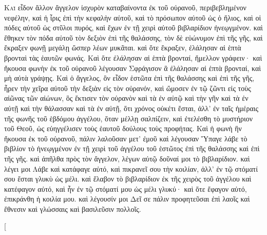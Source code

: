 \begin{pages}
    \begin{Rightside}
        \beginnumbering
		\renewcommand{\LettrineFontHook}{\PHtitl}
		\lettrine[lines=3]{Κ}{αὶ} εἶδον ἄλλον ἄγγελον ἰσχυρὸν καταβαίνοντα ἐκ τοῦ οὐρανοῦ, περιβεβλημένον νεφέλην, καὶ ἡ ἶρις ἐπὶ τὴν κεφαλὴν αὐτοῦ, καὶ τὸ πρόσωπον αὐτοῦ ὡς ὁ ἥλιος, καὶ οἱ πόδες αὐτοῦ ὡς στῦλοι πυρός, καὶ ἔχων ἐν τῇ χειρὶ αὐτοῦ βιβλαρίδιον ἠνεῳγμένον. καὶ ἔθηκεν τὸν πόδα αὐτοῦ τὸν δεξιὸν ἐπὶ τῆς θαλάσσης, τὸν δὲ εὐώνυμον ἐπὶ τῆς γῆς, καὶ ἔκραξεν φωνῇ μεγάλῃ ὥσπερ λέων μυκᾶται. καὶ ὅτε ἔκραξεν, ἐλάλησαν αἱ ἑπτὰ βρονταὶ τὰς ἑαυτῶν φωνάς. 
		\pend
		\pstart
		Καὶ ὅτε ἐλάλησαν αἱ ἑπτὰ βρονταί, ἤμελλον γράφειν· καὶ ἤκουσα φωνὴν ἐκ τοῦ οὐρανοῦ λέγουσαν Σφράγισον ἃ ἐλάλησαν αἱ ἑπτὰ βρονταί, καὶ μὴ αὐτὰ γράψῃς. Καὶ ὁ ἄγγελος, ὃν εἶδον ἑστῶτα ἐπὶ τῆς θαλάσσης καὶ ἐπὶ τῆς γῆς, ἦρεν τὴν χεῖρα αὐτοῦ τὴν δεξιὰν εἰς τὸν οὐρανόν, καὶ ὤμοσεν ἐν τῷ ζῶντι εἰς τοὺς αἰῶνας τῶν αἰώνων, ὃς ἔκτισεν τὸν οὐρανὸν καὶ τὰ ἐν αὐτῷ καὶ τὴν γῆν καὶ τὰ ἐν αὐτῇ καὶ τὴν θάλασσαν καὶ τὰ ἐν αὐτῇ, ὅτι χρόνος οὐκέτι ἔσται, 
		\pend
		\pstart
		ἀλλ’ ἐν ταῖς ἡμέραις τῆς φωνῆς τοῦ ἑβδόμου ἀγγέλου, ὅταν μέλλῃ σαλπίζειν, καὶ ἐτελέσθη τὸ μυστήριον τοῦ Θεοῦ, ὡς εὐηγγέλισεν τοὺς ἑαυτοῦ δούλους τοὺς προφήτας. Καὶ ἡ φωνὴ ἣν ἤκουσα ἐκ τοῦ οὐρανοῦ, πάλιν λαλοῦσαν μετ’ ἐμοῦ καὶ λέγουσαν Ὕπαγε λάβε τὸ βιβλίον τὸ ἠνεῳγμένον ἐν τῇ χειρὶ τοῦ ἀγγέλου τοῦ ἑστῶτος ἐπὶ τῆς θαλάσσης καὶ ἐπὶ τῆς γῆς. 
		\pend
		\pstart
		καὶ ἀπῆλθα πρὸς τὸν ἄγγελον, λέγων αὐτῷ δοῦναί μοι τὸ βιβλαρίδιον. καὶ λέγει μοι Λάβε καὶ κατάφαγε αὐτό, καὶ πικρανεῖ σου τὴν κοιλίαν, ἀλλ’ ἐν τῷ στόματί σου ἔσται γλυκὺ ὡς μέλι. καὶ ἔλαβον τὸ βιβλαρίδιον ἐκ τῆς χειρὸς τοῦ ἀγγέλου καὶ κατέφαγον αὐτό, καὶ ἦν ἐν τῷ στόματί μου ὡς μέλι γλυκύ· καὶ ὅτε ἔφαγον αὐτό, ἐπικράνθη ἡ κοιλία μου. καὶ λέγουσίν μοι Δεῖ σε πάλιν προφητεῦσαι ἐπὶ λαοῖς καὶ ἔθνεσιν καὶ γλώσσαις καὶ βασιλεῦσιν πολλοῖς.
		\pend
        \endnumbering
    \end{Rightside}
    \begin{Leftside}
        \beginnumbering
        \pstart[

\end{Leftside}
\end{pages}
